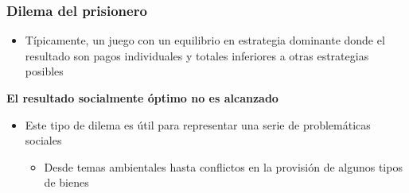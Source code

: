 \documentclass{beamer}
\begin{document}



\begin{frame}
\frametitle{Dilema del prisionero}
\begin{itemize}
    \item Típicamente, un juego con un equilibrio en estrategia dominante donde el resultado son pagos individuales y totales inferiores a otras estrategias posibles
            \end{itemize}
        \textbf{El resultado socialmente óptimo no es alcanzado} \vspace{2mm}
        \begin{itemize}
        \item Este tipo de dilema es útil para representar una serie de problemáticas sociales
        \begin{itemize}
        \item Desde temas ambientales hasta conflictos en la provisión de algunos tipos de bienes
        \end{itemize}
\end{itemize}
\end{frame}
\end{document}
